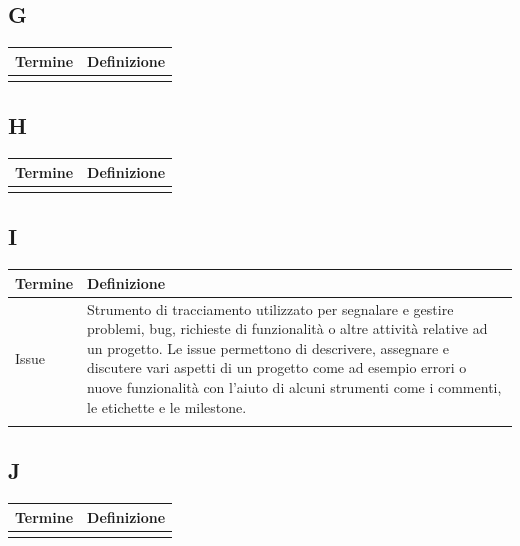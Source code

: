 \documentclass[10pt]{article}
\begin{document}
\subsection{G} %
\begin{tabularx}{\textwidth}{|>{\centering\arraybackslash}l|X|}
\hline
\rowcolor[gray]{0.8}
\textbf{Termine} & \textbf{Definizione}\\
\hline
 & \\
\hline
\end{tabularx}

\subsection{H} %
\begin{tabularx}{\textwidth}{|>{\centering\arraybackslash}l|X|}
\hline
\rowcolor[gray]{0.8}
\textbf{Termine} & \textbf{Definizione}\\
\hline
 & \\
\hline
\end{tabularx}

\subsection{I} %
\begin{tabularx}{\textwidth}{|>{\centering\arraybackslash}l|X|}
\hline
\rowcolor[gray]{0.8}
\textbf{Termine} & \textbf{Definizione}\\
\hline
Issue & Strumento di tracciamento utilizzato per segnalare e gestire problemi, bug, richieste di funzionalità o altre attività relative ad un progetto. Le issue permettono di descrivere, assegnare e discutere vari aspetti di un progetto come ad esempio errori o nuove funzionalità con l'aiuto di alcuni strumenti come i commenti, le etichette e le milestone.\\
\hline
 & \\
\hline
\end{tabularx}

\subsection{J} %
\begin{tabularx}{\textwidth}{|>{\centering\arraybackslash}l|X|}
\hline
\rowcolor[gray]{0.8}
\textbf{Termine} & \textbf{Definizione}\\
\hline
 & \\
\hline
\end{tabularx}
\end{document}
